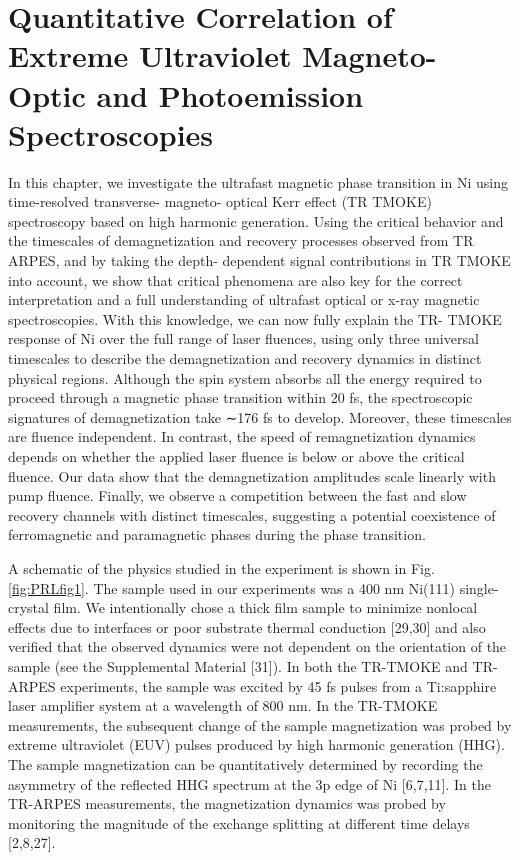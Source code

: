 \chapter{Quantitative Correlation of Extreme Ultraviolet Magneto-Optic and Photoemission Spectroscopies}
\label{PRLchap}
In this chapter, we investigate the ultrafast magnetic phase transition in Ni using time-resolved transverse- magneto- optical Kerr effect (TR TMOKE) spectroscopy based on high harmonic generation. Using the critical behavior and the timescales of demagnetization and recovery processes observed from TR ARPES, and by taking the depth- dependent signal contributions in TR TMOKE into account, we show that critical phenomena are also key for the correct interpretation and a full understanding of ultrafast optical or x-ray magnetic spectroscopies. With this knowledge, we can now fully explain the TR- TMOKE response of Ni over the full range of laser fluences, using only three universal timescales to describe the demagnetization and recovery dynamics in distinct physical regions. Although the spin system absorbs all the energy required to proceed through a magnetic phase transition within 20 fs, the spectroscopic signatures of demagnetization take ∼176 fs to develop. Moreover, these timescales are fluence independent. In contrast, the speed of remagnetization dynamics depends on whether the applied laser fluence is below or above the critical fluence. Our data show that the demagnetization amplitudes scale linearly with pump fluence. Finally, we observe a competition between the fast and slow recovery channels with distinct timescales, suggesting a potential coexistence of ferromagnetic and paramagnetic phases during the phase transition.


A schematic of the physics studied in the experiment is shown in Fig. \ref{fig:PRLfig1}. The sample used in our experiments was a 400 nm Ni(111) single-crystal film. We intentionally chose a thick film sample to minimize nonlocal effects due to interfaces or poor substrate thermal conduction [29,30] and also verified that the observed dynamics were not dependent on the orientation of the sample (see the Supplemental Material [31]). In both the TR-TMOKE and TR-ARPES experiments, the sample was excited by 45 fs pulses from a Ti:sapphire laser amplifier system at a wavelength of 800 nm. In the TR-TMOKE measurements, the subsequent change of the sample magnetization was probed by extreme ultraviolet (EUV) pulses produced by high harmonic generation (HHG). The sample magnetization can be quantitatively determined by recording the asymmetry of the reflected HHG spectrum at the 3p edge of Ni [6,7,11]. In the TR-ARPES measurements, the magnetization dynamics was probed by monitoring the magnitude of the exchange splitting at different time delays [2,8,27].

